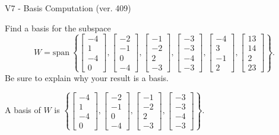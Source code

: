 \begin{exercise}
  \begin{exerciseTitle}V7 - Basis Computation (ver. 409)\end{exerciseTitle}
  \begin{exerciseStatement}
    Find a basis for the subspace 
\[W=\mathrm{span}\ \left\{\left[\begin{array}{r}
-4 \\
1 \\
-4 \\
0
\end{array}\right] , \left[\begin{array}{r}
-2 \\
-1 \\
0 \\
-4
\end{array}\right] , \left[\begin{array}{r}
-1 \\
-2 \\
2 \\
-3
\end{array}\right] , \left[\begin{array}{r}
-3 \\
-3 \\
-4 \\
-3
\end{array}\right] , \left[\begin{array}{r}
-4 \\
3 \\
-1 \\
2
\end{array}\right] , \left[\begin{array}{r}
13 \\
14 \\
2 \\
23
\end{array}\right]\right\}.\]
 Be sure to explain why your result is a basis.


  \end{exerciseStatement}
  \begin{exerciseAnswer}
   A basis of \(W\) is  \(\left\{\left[\begin{array}{r}
-4 \\
1 \\
-4 \\
0
\end{array}\right] , \left[\begin{array}{r}
-2 \\
-1 \\
0 \\
-4
\end{array}\right] , \left[\begin{array}{r}
-1 \\
-2 \\
2 \\
-3
\end{array}\right] , \left[\begin{array}{r}
-3 \\
-3 \\
-4 \\
-3
\end{array}\right]\right\}\).
  


  \end{exerciseAnswer}
\end{exercise}
